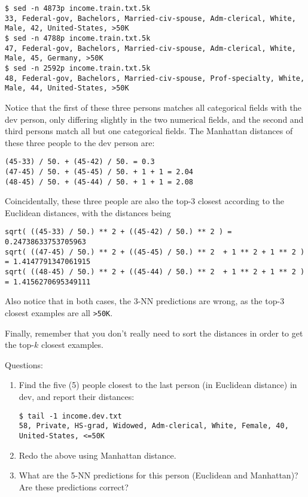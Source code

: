\documentclass[11pt]{article}
\begin{document}
\begin{verbatim}
$ sed -n 4873p income.train.txt.5k
33, Federal-gov, Bachelors, Married-civ-spouse, Adm-clerical, White, Male, 42, United-States, >50K
$ sed -n 4788p income.train.txt.5k
47, Federal-gov, Bachelors, Married-civ-spouse, Adm-clerical, White, Male, 45, Germany, >50K
$ sed -n 2592p income.train.txt.5k
48, Federal-gov, Bachelors, Married-civ-spouse, Prof-specialty, White, Male, 44, United-States, >50K
\end{verbatim}

Notice that the first of these three persons matches all categorical fields with the dev person, only differing slightly in the two numerical fields, 
and the second and third persons match all but one categorical fields.
The Manhattan distances of these three people to the dev person are:

\begin{verbatim}
(45-33) / 50. + (45-42) / 50. = 0.3
(47-45) / 50. + (45-45) / 50. + 1 + 1 = 2.04
(48-45) / 50. + (45-44) / 50. + 1 + 1 = 2.08
\end{verbatim}

Coincidentally, these three people are also the top-3 closest according to the Euclidean distances, with the distances being

\begin{verbatim}
sqrt( ((45-33) / 50.) ** 2 + ((45-42) / 50.) ** 2 ) = 0.24738633753705963
sqrt( ((47-45) / 50.) ** 2 + ((45-45) / 50.) ** 2  + 1 ** 2 + 1 ** 2 ) = 1.4147791347061915
sqrt( ((48-45) / 50.) ** 2 + ((45-44) / 50.) ** 2  + 1 ** 2 + 1 ** 2 ) = 1.4156270695349111
\end{verbatim}

Also notice that in both cases, the 3-NN predictions are wrong,
as the top-3 closest examples are all \verb|>50K|.

Finally, remember that you don't really need to sort the distances 
in order to get the top-$k$ closest examples.

\bigskip

Questions: 

\begin{enumerate}

\item 
Find the five (5) people closest to the last person (in Euclidean distance) in dev, and report their  distances:

\begin{verbatim}
$ tail -1 income.dev.txt
58, Private, HS-grad, Widowed, Adm-clerical, White, Female, 40, United-States, <=50K
\end{verbatim}

\item Redo the above using Manhattan distance.

\item What are the 5-NN predictions for this person (Euclidean and Manhattan)? Are these predictions correct?

\end{enumerate}
\end{document}
